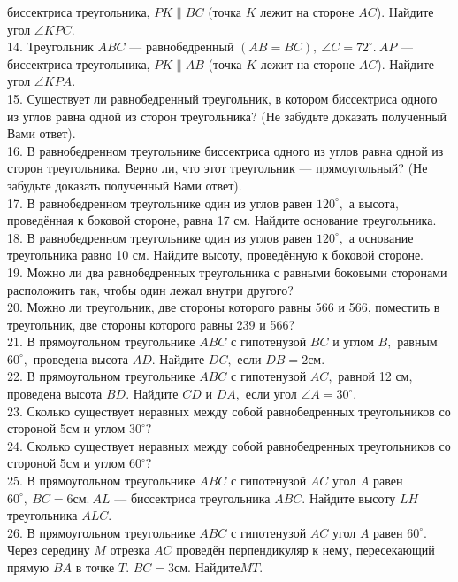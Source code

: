 \documentclass[12pt]{article}
\begin{document}
биссектриса треугольника, $PK\parallel BC$ (точка $K$ лежит на стороне $AC$). Найдите угол $\angle KPC.$\\
14. Треугольник $ABC$ --- равнобедренный $(AB=BC),\ \angle C=72^\circ.\ AP$ ---
биссектриса треугольника, $PK\parallel AB$ (точка $K$ лежит на стороне $AC$). Найдите угол $\angle KPA.$\\
15. Существует ли равнобедренный треугольник, в котором биссектриса одного из углов равна одной из сторон треугольника? (Не забудьте доказать полученный Вами ответ).\\
16. В равнобедренном треугольнике биссектриса одного из углов равна одной из сторон треугольника. Верно ли, что этот треугольник --- прямоугольный? (Не забудьте доказать полученный Вами ответ).\\
17. В равнобедренном треугольнике один из углов равен $120^\circ,$ а высота, проведённая к боковой стороне, равна 17 см. Найдите основание треугольника.\\
18. В равнобедренном треугольнике один из углов равен $120^\circ,$ а основание треугольника равно 10 см. Найдите высоту, проведённую к боковой стороне.\\
19. Можно ли два равнобедренных треугольника с равными боковыми сторонами расположить так, чтобы один лежал внутри другого?\\
20. Можно ли треугольник, две стороны которого равны 566 и 566, поместить в треугольник, две стороны которого равны 239 и 566?\\
21. В прямоугольном треугольнике $ABC$ с гипотенузой $BC$ и углом $B,$ равным $60^\circ,$ проведена высота $AD.$ Найдите $DC,$ если $DB=2\text{см}.$\\
22. В прямоугольном треугольнике $ABC$ с гипотенузой $AC,$ равной 12 см, проведена высота $BD.$ Найдите $CD$ и $DA,$ если угол $\angle A=30^\circ.$\\
23. Сколько существует неравных между собой равнобедренных треугольников со стороной 5см и углом $30^\circ ?$\\
24. Сколько существует неравных между собой равнобедренных треугольников со стороной 5см и углом $60^\circ ?$\\
25. В прямоугольном треугольнике $ABC$ с гипотенузой $AC$ угол $A$ равен $60^\circ,\ BC=6\text{см}.\ AL$ --- биссектриса треугольника $ABC.$ Найдите высоту $LH$ треугольника $ALC.$\\
26. В прямоугольном треугольнике $ABC$ с гипотенузой $AC$ угол $A$ равен $60^\circ.$ Через середину $M$ отрезка $AC$ проведён перпендикуляр к нему, пересекающий прямую $BA$ в точке $T.$ $BC=3\text{см}.$ Найдите$MT.$\\
\end{document}
